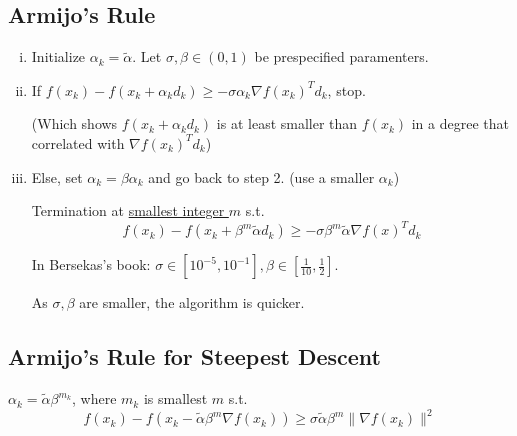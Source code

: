 \documentclass[11pt,a4paper]{article}
\begin{document}
\subsection{Armijo's Rule}
\begin{enumerate}[(i)]
    \item Initialize $\alpha_k=\tilde{\alpha}$. Let $\sigma,\beta \in (0,1)$ be prespecified paramenters.
    \item If $f(x_k)-f(x_k+\alpha_k d_k)\geq-\sigma \alpha_k \nabla f(x_k)^T d_k$, stop.
    
    (Which shows $f(x_k+\alpha_k d_k)$ is at least smaller than $f(x_k)$ in a degree that correlated with $\nabla f(x_k)^T d_k$)
    \item Else, set $\alpha_k=\beta\alpha_k$ and go back to step 2. (use a smaller $\alpha_k$)
    
    Termination at \underline{smallest integer $m$} s.t. $$f(x_k)-f(x_k+\beta^m \tilde{\alpha} d_k)\geq-\sigma\beta^m \tilde{\alpha}\nabla f(x)^T d_k$$

    In Bersekas's book: $\sigma\in[10^{-5},10^{-1}],\beta\in[\frac{1}{10},\frac{1}{2}]$.

    As $\sigma,\beta$ are smaller, the algorithm is quicker.
\end{enumerate}

\subsection{Armijo's Rule for Steepest Descent}
$\alpha_k=\tilde{\alpha}\beta^{m_k}$, where $m_k$ is smallest $m$ s.t. $$f(x_k)-f(x_k-\tilde{\alpha}\beta^{m} \nabla f(x_k))\geq \sigma\tilde{\alpha}\beta^{m}\|\nabla f(x_k)\|^2$$
\end{document}
